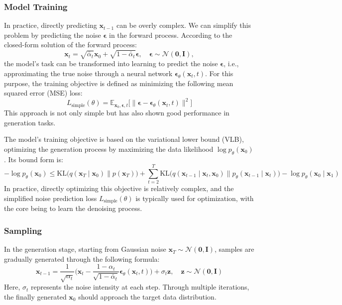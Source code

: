\documentclass[
reprint,
superscriptaddress,
nofootinbib,
amsmath,amssymb,
aps,
prd,
]{revtex4-2}
\begin{document}
\subsubsection{Model Training}

In practice, directly predicting $\mathbf{x}_{t-1}$ can be overly complex. We can simplify this problem by predicting the noise $\boldsymbol{\epsilon}$ in the forward process. According to the closed-form solution of the forward process:
\begin{equation}
    \mathbf{x}_t = \sqrt{\bar{\alpha}_t} \mathbf{x}_0 + \sqrt{1 - \bar{\alpha}_t} \boldsymbol{\epsilon}, \quad \boldsymbol{\epsilon} \sim \mathcal{N}(\mathbf{0}, \mathbf{I}),
\end{equation}
the model's task can be transformed into learning to predict the noise $\boldsymbol{\epsilon}$, i.e., approximating the true noise through a neural network $\boldsymbol{\epsilon}_\theta(\mathbf{x}_t, t)$.
For this purpose, the training objective is defined as minimizing the following mean squared error (MSE) loss:
\begin{equation}
    L_{\text{simple}}(\theta) = \mathbb{E}_{\mathbf{x}_0, \boldsymbol{\epsilon}, t}\bigl[\|\boldsymbol{\epsilon} - \boldsymbol{\epsilon}_\theta(\mathbf{x}_t, t)\|^2\bigr]
\end{equation}
This approach is not only simple but has also shown good performance in generation tasks.


The model's training objective is based on the variational lower bound (VLB), optimizing the generation process by maximizing the data likelihood $\log p_\theta(\mathbf{x}_0)$. Its bound form is:
\begin{equation}
    -\log p_\theta(\mathbf{x}_0) \leq \text{KL}\bigl(q(\mathbf{x}_T \mid \mathbf{x}_0) \| p(\mathbf{x}_T)\bigr) + \sum_{t=2}^T \text{KL}\bigl(q(\mathbf{x}_{t-1} \mid \mathbf{x}_t, \mathbf{x}_0) \| p_\theta(\mathbf{x}_{t-1} \mid \mathbf{x}_t)\bigr) - \log p_\theta(\mathbf{x}_0 \mid \mathbf{x}_1)
\end{equation}
In practice, directly optimizing this objective is relatively complex, and the simplified noise prediction loss $L_{\text{simple}}(\theta)$ is typically used for optimization, with the core being to learn the denoising process.

\subsubsection{Sampling}
In the generation stage, starting from Gaussian noise $\mathbf{x}_T \sim \mathcal{N}(\mathbf{0}, \mathbf{I})$, samples are gradually generated through the following formula:
\begin{equation}
    \mathbf{x}_{t-1} = \frac{1}{\sqrt{\alpha_t}} \bigl(\mathbf{x}_t - \frac{1 - \alpha_t}{\sqrt{1 - \bar{\alpha}_t}} \boldsymbol{\epsilon}_\theta(\mathbf{x}_t, t)\bigr) + \sigma_t \mathbf{z}, \quad \mathbf{z} \sim \mathcal{N}(\mathbf{0}, \mathbf{I})
\end{equation}
Here, $\sigma_t$ represents the noise intensity at each step.
Through multiple iterations, the finally generated $\mathbf{x}_0$ should approach the target data distribution.
\end{document}

